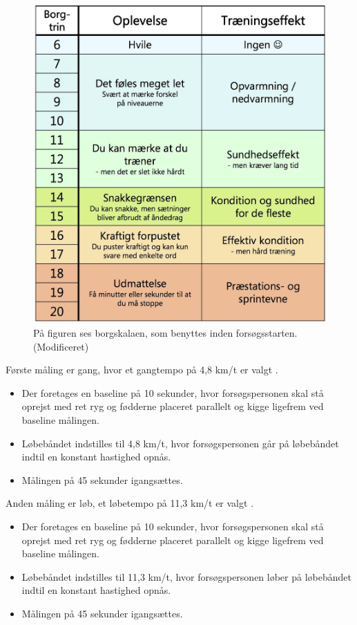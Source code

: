 \begin{figure}[H]
	\centering
	\includegraphics[scale=0.5]{figures/qBilag/Borg-skala.jpg}
	\caption{På figuren ses borgskalaen, som benyttes inden forsøgsstarten. \citep{Patientinformationen2013} (Modificeret)}
	\label{fig:borgskala}
\end{figure}

Første måling er gang, hvor et gangtempo på 4,8 km/t er valgt \citep{Miles2007}. %
\begin{itemize}
	\item Der foretages en baseline på 10 sekunder, hvor forsøgspersonen skal stå oprejst med ret ryg og fødderne placeret parallelt og kigge ligefrem ved baseline målingen.
	\item Løbebåndet indstilles til 4,8 km/t, hvor forsøgspersonen går på løbebåndet indtil en konstant hastighed opnås. 
	\item Målingen på 45 sekunder igangsættes.
\end{itemize}

Anden måling er løb, et løbetempo på 11,3 km/t er valgt \citep{Miles2007}. %
\begin{itemize}
	\item Der foretages en baseline på 10 sekunder, hvor forsøgspersonen skal stå oprejst med ret ryg og fødderne placeret parallelt og kigge ligefrem ved baseline målingen.
	\item Løbebåndet indstilles til 11,3 km/t, hvor forsøgspersonen løber på løbebåndet indtil en konstant hastighed opnås. 
	\item Målingen på 45 sekunder igangsættes.
\end{itemize}

